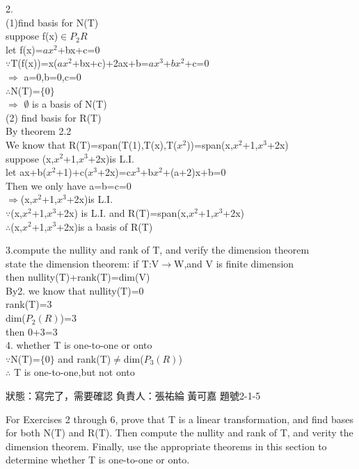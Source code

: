 \documentclass
[answers]
{exam}
\begin{document}
\begin{questions}
\begin{solution}
  2.\\
  (1)find basis for N(T)\\
  suppose f(x)$\in$$P_{2}R$\\
  let f(x)=$ax^2$+bx+c=0\\
  $\because$T(f(x))=x($ax^2$+bx+c)+2ax+b=$ax^3$+$bx^2$+c=0\\$\Rightarrow$ a=0,b=0,c=0\\$\therefore$N(T)=$\lbrace0\rbrace$\\$\Rightarrow$ $\emptyset$ is a basis of N(T)\\
  
  (2) find basis for R(T)\\
  By theorem 2.2\\
We know that R(T)=span(T(1),T(x),T($x^2$))=span(x,$x^2$+1,$x^3$+2x)\\suppose (x,$x^2$+1,$x^3$+2x)is L.I.\\ let ax+b($x^2$+1)+c($x^3$+2x)=c$x^3$+b$x^2$+(a+2)x+b=0\\
Then we only have a=b=c=0\\
$\Rightarrow$(x,$x^2$+1,$x^3$+2x)is L.I.\\$\because$(x,$x^2$+1,$x^3$+2x) is L.I. and R(T)=span(x,$x^2$+1,$x^3$+2x)\\$\therefore$(x,$x^2$+1,$x^3$+2x)is a basis of R(T)

  3.compute the nullity and rank of T, and verify the dimension theorem\\
  state the dimension theorem:
  if T:V$\rightarrow$W,and V is finite dimension\\
  then nullity(T)+rank(T)=dim(V)\\
  By2. we know that
  nullity(T)=0\\
  rank(T)=3\\
  dim($P_{2}(R)$)=3\\
  then 0+3=3\\
  
  4. whether T is one-to-one or onto\\
  $\because$N(T)=$\lbrace0\rbrace$ and rank(T)$\neq$dim($P_3(R)$)\\
  $\therefore$ T is one-to-one,but not onto
  
\end{solution}
    \begin{tcolorbox}
    狀態：寫完了，需要確認  負責人：張祐綸  黃可嘉    題號2-1-5
    \end{tcolorbox}
    \question
For Exercises 2 through 6, prove that T is a linear transformation, and find bases for both N(T) and R(T). Then compute the nullity and rank of T, and verity the dimension theorem. Finally, use the appropriate theorems in this section to determine whether T is one-to-one or onto.


\end{questions}
\end{document}
